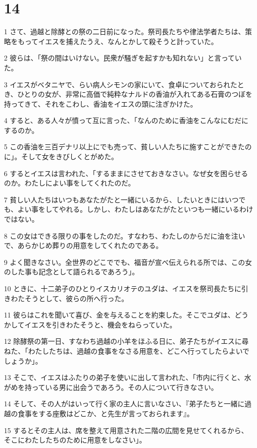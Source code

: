 \chapter{14}

\par 1 さて、過越と除酵との祭の二日前になった。祭司長たちや律法学者たちは、策略をもってイエスを捕えたうえ、なんとかして殺そうと計っていた。
\par 2 彼らは、「祭の間はいけない。民衆が騒ぎを起すかも知れない」と言っていた。
\par 3 イエスがベタニヤで、らい病人シモンの家にいて、食卓についておられたとき、ひとりの女が、非常に高価で純粋なナルドの香油が入れてある石膏のつぼを持ってきて、それをこわし、香油をイエスの頭に注ぎかけた。
\par 4 すると、ある人々が憤って互に言った、「なんのために香油をこんなにむだにするのか。
\par 5 この香油を三百デナリ以上にでも売って、貧しい人たちに施すことができたのに」。そして女をきびしくとがめた。
\par 6 するとイエスは言われた、「するままにさせておきなさい。なぜ女を困らせるのか。わたしによい事をしてくれたのだ。
\par 7 貧しい人たちはいつもあなたがたと一緒にいるから、したいときにはいつでも、よい事をしてやれる。しかし、わたしはあなたがたといつも一緒にいるわけではない。
\par 8 この女はできる限りの事をしたのだ。すなわち、わたしのからだに油を注いで、あらかじめ葬りの用意をしてくれたのである。
\par 9 よく聞きなさい。全世界のどこででも、福音が宣べ伝えられる所では、この女のした事も記念として語られるであろう」。
\par 10 ときに、十二弟子のひとりイスカリオテのユダは、イエスを祭司長たちに引きわたそうとして、彼らの所へ行った。
\par 11 彼らはこれを聞いて喜び、金を与えることを約束した。そこでユダは、どうかしてイエスを引きわたそうと、機会をねらっていた。
\par 12 除酵祭の第一日、すなわち過越の小羊をほふる日に、弟子たちがイエスに尋ねた、「わたしたちは、過越の食事をなさる用意を、どこへ行ってしたらよいでしょうか」。
\par 13 そこで、イエスはふたりの弟子を使いに出して言われた、「市内に行くと、水がめを持っている男に出会うであろう。その人について行きなさい。
\par 14 そして、その人がはいって行く家の主人に言いなさい、『弟子たちと一緒に過越の食事をする座敷はどこか、と先生が言っておられます』。
\par 15 するとその主人は、席を整えて用意された二階の広間を見せてくれるから、そこにわたしたちのために用意をしなさい」。
